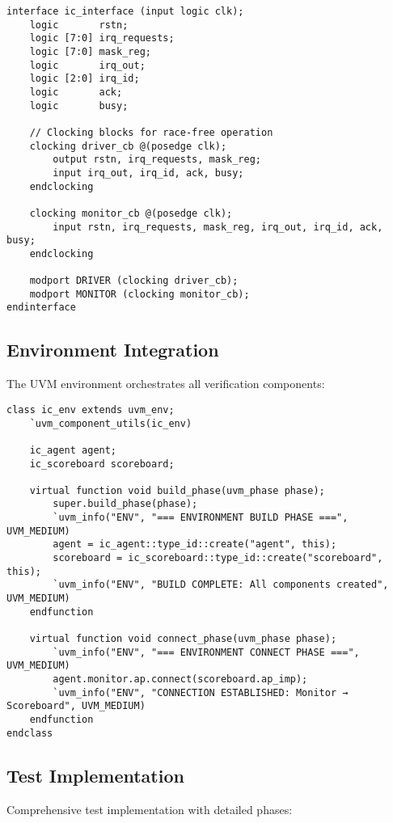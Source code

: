 \documentclass[12pt,a4paper]{article}
\begin{document}
\begin{lstlisting}[caption=SystemVerilog Interface with Clocking Blocks, label=lst:interface]
interface ic_interface (input logic clk);
    logic       rstn;
    logic [7:0] irq_requests;
    logic [7:0] mask_reg;
    logic       irq_out;
    logic [2:0] irq_id;
    logic       ack;
    logic       busy;
    
    // Clocking blocks for race-free operation
    clocking driver_cb @(posedge clk);
        output rstn, irq_requests, mask_reg;
        input irq_out, irq_id, ack, busy;
    endclocking
    
    clocking monitor_cb @(posedge clk);
        input rstn, irq_requests, mask_reg, irq_out, irq_id, ack, busy;
    endclocking
    
    modport DRIVER (clocking driver_cb);
    modport MONITOR (clocking monitor_cb);
endinterface
\end{lstlisting}

\subsection{Environment Integration}
The UVM environment orchestrates all verification components:

\begin{lstlisting}[caption=UVM Environment Class, label=lst:environment]
class ic_env extends uvm_env;
    `uvm_component_utils(ic_env)
    
    ic_agent agent;
    ic_scoreboard scoreboard;
    
    virtual function void build_phase(uvm_phase phase);
        super.build_phase(phase);
        `uvm_info("ENV", "=== ENVIRONMENT BUILD PHASE ===", UVM_MEDIUM)
        agent = ic_agent::type_id::create("agent", this);
        scoreboard = ic_scoreboard::type_id::create("scoreboard", this);
        `uvm_info("ENV", "BUILD COMPLETE: All components created", UVM_MEDIUM)
    endfunction
    
    virtual function void connect_phase(uvm_phase phase);
        `uvm_info("ENV", "=== ENVIRONMENT CONNECT PHASE ===", UVM_MEDIUM)
        agent.monitor.ap.connect(scoreboard.ap_imp);
        `uvm_info("ENV", "CONNECTION ESTABLISHED: Monitor → Scoreboard", UVM_MEDIUM)
    endfunction
endclass
\end{lstlisting}

\subsection{Test Implementation}
Comprehensive test implementation with detailed phases:
\end{document}
